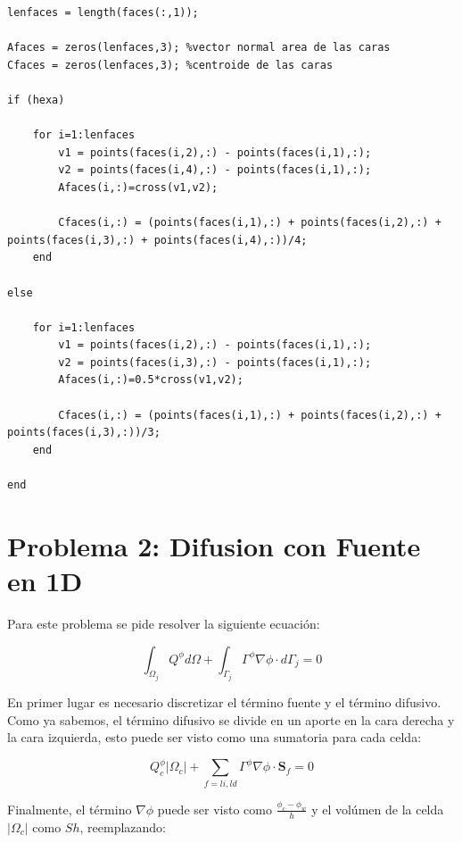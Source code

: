 \documentclass[11pt]{article}
\begin{document}
\bigskip
\lstset{language=Matlab, breaklines=true, basicstyle=\footnotesize}
\begin{lstlisting}[frame=single]
lenfaces = length(faces(:,1));

Afaces = zeros(lenfaces,3); %vector normal area de las caras
Cfaces = zeros(lenfaces,3); %centroide de las caras

if (hexa)

    for i=1:lenfaces
        v1 = points(faces(i,2),:) - points(faces(i,1),:);
        v2 = points(faces(i,4),:) - points(faces(i,1),:);
        Afaces(i,:)=cross(v1,v2);

        Cfaces(i,:) = (points(faces(i,1),:) + points(faces(i,2),:) + points(faces(i,3),:) + points(faces(i,4),:))/4;
    end

else
    
    for i=1:lenfaces
        v1 = points(faces(i,2),:) - points(faces(i,1),:);
        v2 = points(faces(i,3),:) - points(faces(i,1),:);
        Afaces(i,:)=0.5*cross(v1,v2);
        
        Cfaces(i,:) = (points(faces(i,1),:) + points(faces(i,2),:) + points(faces(i,3),:))/3;
    end
    
end
\end{lstlisting}
\bigskip

\section{Problema 2: Difusion con Fuente en 1D}

Para este problema se pide resolver la siguiente ecuaci\'on:

\begin{equation}
\int_{\Omega_j} Q^{\phi} d \Omega + \int_{\Gamma_j} \Gamma^\phi \nabla \phi \cdot d \Gamma_j = 0
\end{equation}

\bigskip En primer lugar es necesario discretizar el t\'ermino fuente y el t\'ermino difusivo. Como ya sabemos, el t\'ermino difusivo se divide en un aporte en la cara derecha y la cara izquierda, esto puede ser visto como una sumatoria para cada celda:

\begin{equation}
Q^{\phi}_c |\Omega_c| + \sum_{f = li,ld} \Gamma^\phi \nabla \phi \cdot \textbf{S}_f = 0
\end{equation}

\bigskip Finalmente, el t\'ermino $\nabla \phi$ puede ser visto como $\frac{\phi_c - \phi_w}{h}$ y el vol\'umen de la celda $|\Omega_c|$ como $S h$, reemplazando:
\end{document}
